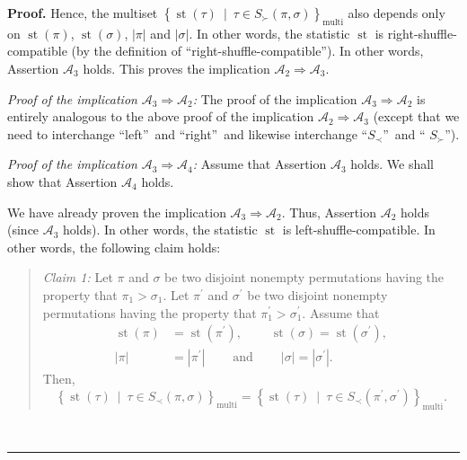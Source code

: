 \documentclass[numbers=enddot,12pt,final,onecolumn,notitlepage]{scrartcl}%
\theoremstyle{definition}
\newenvironment{statement}{\begin{quote}}{\end{quote}}
\newenvironment{proof}[1][Proof]{\noindent\textbf{#1.} }{\ \rule{0.5em}{0.5em}}
\newenvironment{verlong}{}{}
\begin{document}
\begin{verlong}
\begin{proof}
Hence, the multiset $\left\{  \operatorname*{st}\left(  \tau\right)
\ \mid\ \tau\in S_{\succ}\left(  \pi,\sigma\right)  \right\}
_{\operatorname*{multi}}$ also depends only on $\operatorname*{st}\left(
\pi\right)  $, $\operatorname*{st}\left(  \sigma\right)  $, $\left\vert
\pi\right\vert $ and $\left\vert \sigma\right\vert $. In other words, the
statistic $\operatorname*{st}$ is right-shuffle-compatible (by the definition
of \textquotedblleft right-shuffle-compatible\textquotedblright). In other
words, Assertion $\mathcal{A}_{3}$ holds. This proves the implication
$\mathcal{A}_{2}\Longrightarrow\mathcal{A}_{3}$.

\textit{Proof of the implication }$\mathcal{A}_{3}\Longrightarrow
\mathcal{A}_{2}$\textit{:} The proof of the implication $\mathcal{A}%
_{3}\Longrightarrow\mathcal{A}_{2}$ is entirely analogous to the above proof
of the implication $\mathcal{A}_{2}\Longrightarrow\mathcal{A}_{3}$ (except
that we need to interchange \textquotedblleft left\textquotedblright\ and
\textquotedblleft right\textquotedblright\ and likewise interchange
\textquotedblleft$S_{\prec}$\textquotedblright\ and \textquotedblleft%
$S_{\succ}$\textquotedblright).

\textit{Proof of the implication }$\mathcal{A}_{3}\Longrightarrow
\mathcal{A}_{4}$\textit{:} Assume that Assertion $\mathcal{A}_{3}$ holds. We
shall show that Assertion $\mathcal{A}_{4}$ holds.

We have already proven the implication $\mathcal{A}_{3}\Longrightarrow
\mathcal{A}_{2}$. Thus, Assertion $\mathcal{A}_{2}$ holds (since
$\mathcal{A}_{3}$ holds). In other words, the statistic $\operatorname*{st}$
is left-shuffle-compatible. In other words, the following claim holds:

\begin{statement}
\textit{Claim 1:} Let $\pi$ and $\sigma$ be two disjoint nonempty permutations
having the property that $\pi_{1}>\sigma_{1}$. Let $\pi^{\prime}$ and
$\sigma^{\prime}$ be two disjoint nonempty permutations having the property
that $\pi_{1}^{\prime}>\sigma_{1}^{\prime}$. Assume that%
\begin{align*}
\operatorname*{st}\left(  \pi\right)   &  =\operatorname*{st}\left(
\pi^{\prime}\right)  ,\ \ \ \ \ \ \ \ \ \ \operatorname*{st}\left(
\sigma\right)  =\operatorname*{st}\left(  \sigma^{\prime}\right)  ,\\
\left\vert \pi\right\vert  &  =\left\vert \pi^{\prime}\right\vert
\ \ \ \ \ \ \ \ \ \ \text{and}\ \ \ \ \ \ \ \ \ \ \left\vert \sigma\right\vert
=\left\vert \sigma^{\prime}\right\vert .
\end{align*}
Then,
\[
\left\{  \operatorname*{st}\left(  \tau\right)  \ \mid\ \tau\in S_{\prec
}\left(  \pi,\sigma\right)  \right\}  _{\operatorname*{multi}}=\left\{
\operatorname*{st}\left(  \tau\right)  \ \mid\ \tau\in S_{\prec}\left(
\pi^{\prime},\sigma^{\prime}\right)  \right\}  _{\operatorname*{multi}}.
\]


\end{statement}
\end{proof}
\end{verlong}
\end{document}
